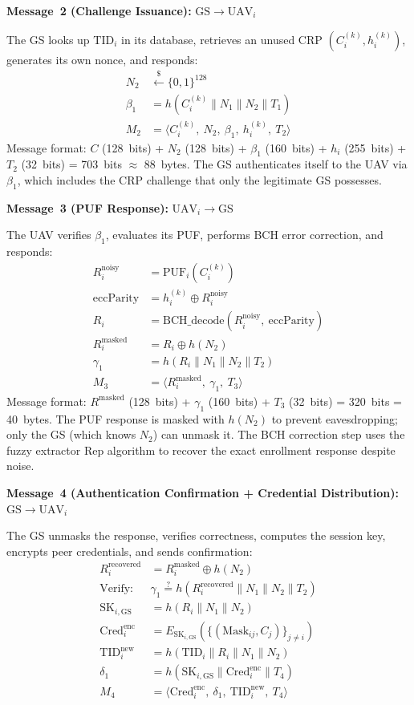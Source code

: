 \documentclass[11pt,a4paper]{article}
\begin{document}
\textbf{Message~2 (Challenge Issuance):} $\text{GS} \rightarrow \text{UAV}_i$

The GS looks up $\text{TID}_i$ in its database, retrieves an unused CRP $(C_i^{(k)}, h_i^{(k)})$, generates its own nonce, and responds:
\begin{align}
N_2 &\xleftarrow{\$} \{0,1\}^{128} \\
\beta_1 &= h(C_i^{(k)} \| N_1 \| N_2 \| T_1) \\
M_2 &= \langle C_i^{(k)},\ N_2,\ \beta_1,\ h_i^{(k)},\ T_2 \rangle
\end{align}
Message format: $C$ (128~bits) + $N_2$ (128~bits) + $\beta_1$ (160~bits) + $h_i$ (255~bits) + $T_2$ (32~bits) = 703~bits $\approx$ 88~bytes. The GS authenticates itself to the UAV via $\beta_1$, which includes the CRP challenge that only the legitimate GS possesses.

\textbf{Message~3 (PUF Response):} $\text{UAV}_i \rightarrow \text{GS}$

The UAV verifies $\beta_1$, evaluates its PUF, performs BCH error correction, and responds:
\begin{align}
R_i^{\text{noisy}} &= \text{PUF}_i(C_i^{(k)}) \\
\text{eccParity} &= h_i^{(k)} \oplus R_i^{\text{noisy}} \\
R_i &= \text{BCH\_decode}(R_i^{\text{noisy}},\ \text{eccParity}) \\
R_i^{\text{masked}} &= R_i \oplus h(N_2) \\
\gamma_1 &= h(R_i \| N_1 \| N_2 \| T_2) \\
M_3 &= \langle R_i^{\text{masked}},\ \gamma_1,\ T_3 \rangle
\end{align}
Message format: $R^{\text{masked}}$ (128~bits) + $\gamma_1$ (160~bits) + $T_3$ (32~bits) = 320~bits = 40~bytes. The PUF response is masked with $h(N_2)$ to prevent eavesdropping; only the GS (which knows $N_2$) can unmask it. The BCH correction step uses the fuzzy extractor Rep algorithm to recover the exact enrollment response despite noise.

\textbf{Message~4 (Authentication Confirmation + Credential Distribution):} $\text{GS} \rightarrow \text{UAV}_i$

The GS unmasks the response, verifies correctness, computes the session key, encrypts peer credentials, and sends confirmation:
\begin{align}
R_i^{\text{recovered}} &= R_i^{\text{masked}} \oplus h(N_2) \\
\text{Verify:}\ &\gamma_1 \stackrel{?}{=} h(R_i^{\text{recovered}} \| N_1 \| N_2 \| T_2) \\
\text{SK}_{i,\text{GS}} &= h(R_i \| N_1 \| N_2) \\
\text{Cred}_i^{\text{enc}} &= E_{\text{SK}_{i,\text{GS}}}(\{(\text{Mask}_{ij}, C_j)\}_{j \neq i}) \\
\text{TID}_i^{\text{new}} &= h(\text{TID}_i \| R_i \| N_1 \| N_2) \\
\delta_1 &= h(\text{SK}_{i,\text{GS}} \| \text{Cred}_i^{\text{enc}} \| T_4) \\
M_4 &= \langle \text{Cred}_i^{\text{enc}},\ \delta_1,\ \text{TID}_i^{\text{new}},\ T_4 \rangle
\end{align}
\end{document}
